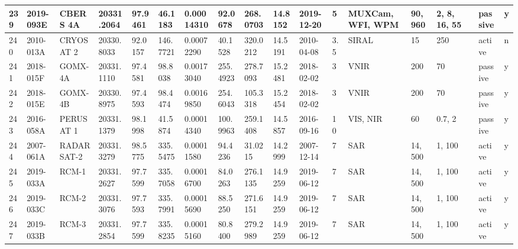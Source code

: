 \documentclass[12pt,a4paper,notitlepage,twoside,openright]{report}
\begin{document}
\begin{longtable}{|l|l|l|l|l|l|l|l|l|l|l|l|l|l|l|l|l|l|}
        239 & 2019-093E & CBERS 4A & 20331.2064 & 97.9461 & 46.1183 & 0.00014310 & 92.0678 & 268.0703 & 14.8152 & 2019-12-20 & 5 & MUXCam, WFI, WPM & 90, 960 & 2, 8, 16, 55 &  & passive & y \\ \hline
        240 & 2010-013A & CRYOSAT 2 & 20330.8033 & 92.0157 & 146.7721 & 0.00072290 & 40.1528 & 320.0212 & 14.5191 & 2010-04-08 & 3.5 & SIRAL & 15 & 250 &  & active & n \\ \hline
        241 & 2018-015F & GOMX-4A & 20331.1110 & 97.4581 & 98.8038 & 0.00173040 & 255.4923 & 278.7093 & 15.2481 & 2018-02-02 & 3 & VNIR & 200 & 70 &  & passive & y \\ \hline
        242 & 2018-015E & GOMX-4B & 20330.8975 & 97.4593 & 98.4474 & 0.00169850 & 254.6043 & 105.3318 & 15.2454 & 2018-02-02 & 3 & VNIR & 200 & 70 &  & passive & y \\ \hline
        243 & 2016-058A & PERUSAT 1 & 20331.1379 & 98.1998 & 41.5874 & 0.00014340 & 100.9963 & 259.1408 & 14.5857 & 2016-09-16 & 10 & VIS, NIR & 60 & 0.7, 2 &  & passive & y \\ \hline
        244 & 2007-061A & RADARSAT-2 & 20331.3279 & 98.5775 & 335.5475 & 0.00011580 & 94.4236 & 31.0215 & 14.2999 & 2007-12-14 & 7 & SAR & 14, 500 & 1, 100 &  & active & y \\ \hline
        245 & 2019-033A & RCM-1 & 20331.2627 & 97.7599 & 335.7058 & 0.00016700 & 84.0263 & 276.1135 & 14.9259 & 2019-06-12 & 7 & SAR & 14, 500 & 1, 100 &  & active & y \\ \hline
        246 & 2019-033C & RCM-2 & 20331.3076 & 97.7593 & 335.7991 & 0.00015690 & 88.5250 & 271.6151 & 14.9259 & 2019-06-12 & 7 & SAR & 14, 500 & 1, 100 &  & active & y \\ \hline
        247 & 2019-033B & RCM-3 & 20331.2854 & 97.7599 & 335.8235 & 0.00015160 & 80.8400 & 279.2989 & 14.9259 & 2019-06-12 & 7 & SAR & 14, 500 & 1, 100 &  & active & y \\ \hline
\end{longtable}
\end{document}
